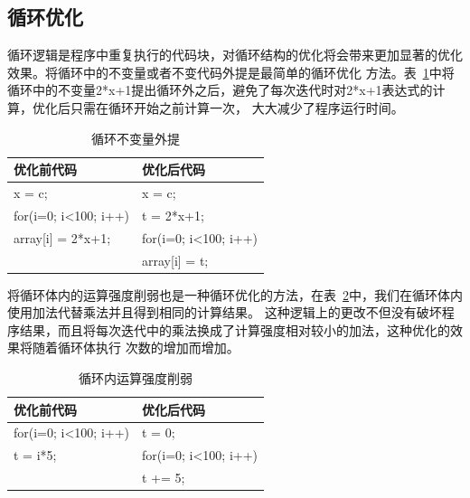 \subsection{循环优化}
循环逻辑是程序中重复执行的代码块，对循环结构的优化将会带来更加显著的优化效果。将循环中的不变量或者不变代码外提是最简单的循环优化
方法。表~\ref{table4}中将循环中的不变量2*x+1提出循环外之后，避免了每次迭代时对2*x+1表达式的计算，优化后只需在循环开始之前计算一次，
大大减少了程序运行时间。
\begin{table}[h]
  \centering
  \caption{循环不变量外提}
  \begin{tabular}{ll}
    \hline
    优化前代码             & 优化后代码   \\
    \hline
    x = c;                    & x = c;    \\
    for(i=0; i<100; i++)      & t = 2*x+1; \\
      array[i] = 2*x+1;       & for(i=0; i<100; i++) \\
	                          &    array[i] = t;  \\
   \hline
  \end{tabular}
  \label{table4}
\end{table}
将循环体内的运算强度削弱也是一种循环优化的方法，在表~\ref{table5}中，我们在循环体内使用加法代替乘法并且得到相同的计算结果。
这种逻辑上的更改不但没有破坏程序结果，而且将每次迭代中的乘法换成了计算强度相对较小的加法，这种优化的效果将随着循环体执行
次数的增加而增加。
\begin{table}[h]
  \centering
  \caption{循环内运算强度削弱}
  \begin{tabular}{ll}
    \hline
    优化前代码             & 优化后代码   \\
    \hline
    for(i=0; i<100; i++)      & t = 0; \\
       t = i*5;                & for(i=0; i<100; i++)\\ 
                             &    t += 5;\\
  \hline
  \end{tabular}
  \label{table5}
\end{table}











